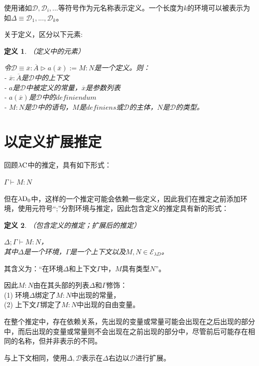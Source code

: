 \documentclass[UTF8]{article}
\newtheorem{thm}{定义}[section]
\begin{document}
		使用诸如$\mathcal{D},\mathcal{D}_i,...$等符号作为元名称表示定义。一个长度为$k$的环境可以被表示为如$\Delta\equiv\mathcal{D}_1,...,\mathcal{D}_k$。
		
		关于定义，区分以下元素:
		
		\begin{thm}（定义中的元素）
			
			\noindent
			令$\mathcal{D}\equiv\overline{x}:\overline{A}\triangleright a(\overline{x}):=M:N$是一个定义。则：\\
			- $\overline{x}:\overline{A}$是$\mathcal{D}$中的上下文\\
			- $a$是$\mathcal{D}$中被定义的常量，$\overline{x}$是参数列表\\
			- $a(\overline{x})$是$\mathcal{D}$中的$definiendum$\\
			- $M:N$是$\mathcal{D}$中的语句，$M$是$definiens$或$\mathcal{D}$的主体，$N$是$\mathcal{D}$的类型。
		\end{thm}

	\section{以定义扩展推定}
	\noindent
	回顾$\lambda{\rm C}$中的推定，具有如下形式：
	
		$\Gamma\vdash M:N$
		
		但在$\lambda{\rm D_0}$中，这样的一个推定可能会依赖一些定义，因此我们在推定之前添加环境，使用元符号“;”分割环境与推定，因此包含定义的推定具有新的形式：
		
		\begin{thm}（包含定义的推定；扩展后的推定）
			
			$\Delta;\Gamma\vdash M:N$，\\
			其中$\Delta$是一个环境，$\Gamma$是一个上下文以及$M,N\in\mathcal{E}_{\lambda{D}}$。
		\end{thm}
	
		其含义为：“在环境$\Delta$和上下文$\Gamma$中，$M$具有类型$N$”。
		
		因此$M:N$由在其头部的列表$\Delta$和$\Gamma$修饰：\\
		(1) 环境$\Delta$绑定了$M:N$中出现的常量，\\
		(2) 上下文$\Gamma$绑定了$M:N$中出现的自由变量。
		
		在整个推定中，存在依赖关系，先出现的变量或常量可能会出现在之后出现的部分中，而后出现的变量或常量则不会出现在之前出现的部分中，尽管前后可能存在相同的名称，但并非表示的不同。
		
		与上下文相同，使用$\Delta,\mathcal{D}$表示在$\Delta$右边以$\mathcal{D}$进行扩展。
		
\end{document}
